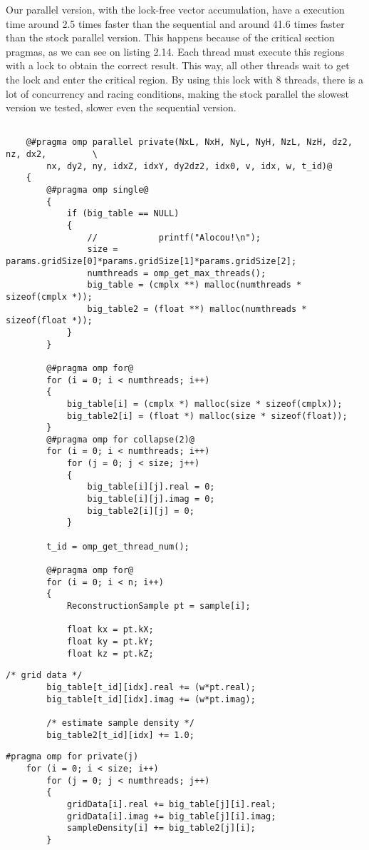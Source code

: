 \documentclass[10pt,a4paper]{report}
\begin{document}
Our parallel version, with the lock-free vector accumulation, have a execution time around 2.5 times faster than the sequential and around 41.6 times faster than the stock parallel version. This happens because of the critical section pragmas, as we can see on listing 2.14. Each thread must execute this regions with a lock to obtain the correct result. This way, all other threads wait to get the lock and enter the critical region. By using this lock with 8 threads, there is a lot of concurrency and racing conditions, making the stock parallel the slowest version we tested, slower even the sequential version.\\

\newpage
\begin{center}
\begin{lstlisting}[caption=Our parallel lock-free structure allocation for mri-gridding,style=base]

	@#pragma omp parallel private(NxL, NxH, NyL, NyH, NzL, NzH, dz2, nz, dx2,         \
		nx, dy2, ny, idxZ, idxY, dy2dz2, idx0, v, idx, w, t_id)@
	{
		@#pragma omp single@
		{
			if (big_table == NULL)
			{
				//			  printf("Alocou!\n");
				size = params.gridSize[0]*params.gridSize[1]*params.gridSize[2];
				numthreads = omp_get_max_threads();	  
				big_table = (cmplx **) malloc(numthreads * sizeof(cmplx *));
				big_table2 = (float **) malloc(numthreads * sizeof(float *));
			}
		}

		@#pragma omp for@
		for (i = 0; i < numthreads; i++)
		{
			big_table[i] = (cmplx *) malloc(size * sizeof(cmplx));
			big_table2[i] = (float *) malloc(size * sizeof(float));
		}
		@#pragma omp for collapse(2)@
		for (i = 0; i < numthreads; i++)
			for (j = 0; j < size; j++)
			{
				big_table[i][j].real = 0;
				big_table[i][j].imag = 0;
				big_table2[i][j] = 0;
			}

		t_id = omp_get_thread_num();

		@#pragma omp for@
		for (i = 0; i < n; i++)
		{
			ReconstructionSample pt = sample[i];

			float kx = pt.kX;
			float ky = pt.kY;
			float kz = pt.kZ;
\end{lstlisting}

\begin{lstlisting}[caption=Our parallel partial data processing code for mri-gridding,style=base]
		/* grid data */
		big_table[t_id][idx].real += (w*pt.real);
		big_table[t_id][idx].imag += (w*pt.imag);

		/* estimate sample density */
		big_table2[t_id][idx] += 1.0;		
\end{lstlisting}

\begin{lstlisting}[caption=Our parallel final data processing code for mri-gridding,style=base]
	#pragma omp for private(j)
	for (i = 0; i < size; i++)
		for (j = 0; j < numthreads; j++)
		{
			gridData[i].real += big_table[j][i].real;
			gridData[i].imag += big_table[j][i].imag;
			sampleDensity[i] += big_table2[j][i];
		}
\end{lstlisting}
\end{center}
\end{document}
